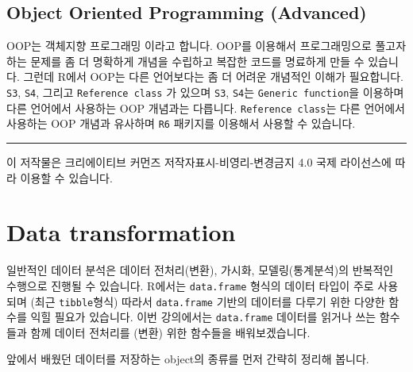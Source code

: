 \documentclass[
]{book}
\begin{document}
\hypertarget{object-oriented-programming-advanced}{%
\section{Object Oriented Programming (Advanced)}\label{object-oriented-programming-advanced}}

OOP는 객체지향 프로그래밍 이라고 합니다. OOP를 이용해서 프로그래밍으로 풀고자 하는 문제를 좀 더 명확하게 개념을 수립하고 복잡한 코드를 명료하게 만들 수 있습니다. 그런데 R에서 OOP는 다른 언어보다는 좀 더 어려운 개념적인 이해가 필요합니다. \texttt{S3}, \texttt{S4}, 그리고 \texttt{Reference\ class} 가 있으며 \texttt{S3}, \texttt{S4}는 \texttt{Generic\ function}을 이용하며 다른 언어에서 사용하는 OOP 개념과는 다릅니다. \texttt{Reference\ class}는 다른 언어에서 사용하는 OOP 개념과 유사하며 \texttt{R6} 패키지를 이용해서 사용할 수 있습니다.

\begin{center}\rule{0.5\linewidth}{0.5pt}\end{center}

이 저작물은 크리에이티브 커먼즈 저작자표시-비영리-변경금지 4.0 국제 라이선스에 따라 이용할 수 있습니다.

\hypertarget{data-transformation}{%
\chapter{Data transformation}\label{data-transformation}}

일반적인 데이터 분석은 데이터 전처리(변환), 가시화, 모델링(통계분석)의 반복적인 수행으로 진행될 수 있습니다. R에서는 \texttt{data.frame} 형식의 데이터 타입이 주로 사용되며 (최근 \texttt{tibble}형식) 따라서 \texttt{data.frame} 기반의 데이터를 다루기 위한 다양한 함수를 익힐 필요가 있습니다. 이번 강의에서는 \texttt{data.frame} 데이터를 읽거나 쓰는 함수들과 함께 데이터 전처리를 (변환) 위한 함수들을 배워보겠습니다.

앞에서 배웠던 데이터를 저장하는 object의 종류를 먼저 간략히 정리해 봅니다.
\end{document}
